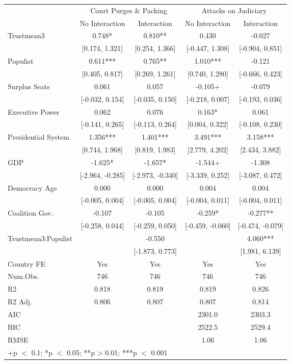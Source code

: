 \begin{table}
\centering\centering\centering
\fontsize{10}{12}\selectfont
\begin{tabular}[t]{lcccc}
\toprule
\multicolumn{1}{c}{ } & \multicolumn{2}{c}{Court Purges \& Packing} & \multicolumn{2}{c}{Attacks on Judiciary} \\
\cmidrule(l{3pt}r{3pt}){2-3} \cmidrule(l{3pt}r{3pt}){4-5}
  & No Interaction & Interaction & No Interaction  & Interaction \\
\midrule
Trustmean3 & 0.748* & 0.810** & 0.430 & -0.027\\
 & {}[0.174, 1.321] & {}[0.254, 1.366] & {}[-0.447, 1.308] & {}[-0.904, 0.851]\\
Populist & 0.611*** & 0.765** & 1.010*** & -0.121\\
 & {}[0.405, 0.817] & {}[0.269, 1.261] & {}[0.740, 1.280] & {}[-0.666, 0.423]\\
Surplus Seats & 0.061 & 0.057 & -0.105+ & -0.079\\
 & {}[-0.032, 0.154] & {}[-0.035, 0.150] & {}[-0.218, 0.007] & {}[-0.193, 0.036]\\
Executive Power & 0.062 & 0.076 & 0.163* & 0.061\\
 & {}[-0.141, 0.265] & {}[-0.113, 0.264] & {}[0.004, 0.322] & {}[-0.108, 0.230]\\
Presidential System & 1.356*** & 1.401*** & 3.491*** & 3.158***\\
 & {}[0.744, 1.968] & {}[0.819, 1.983] & {}[2.779, 4.202] & {}[2.434, 3.882]\\
GDP & -1.625* & -1.657* & -1.544+ & -1.308\\
 & {}[-2.964, -0.285] & {}[-2.973, -0.340] & {}[-3.339, 0.252] & {}[-3.087, 0.472]\\
Democracy Age & 0.000 & 0.000 & 0.004 & 0.004\\
 & {}[-0.005, 0.004] & {}[-0.005, 0.004] & {}[-0.004, 0.011] & {}[-0.004, 0.011]\\
Coalition Gov. & -0.107 & -0.105 & -0.259* & -0.277**\\
 & {}[-0.258, 0.044] & {}[-0.259, 0.050] & {}[-0.459, -0.060] & {}[-0.474, -0.079]\\
Trustmean3:Populist &  & -0.550 &  & 4.060***\\
 &  & {}[-1.873, 0.773] &  & {}[1.981, 6.139]\\
\midrule
Country FE & Yes & Yes & Yes & Yes\\
Num.Obs. & 746 & 746 & 746 & 746\\
R2 & 0.818 & 0.819 & 0.819 & 0.826\\
R2 Adj. & 0.806 & 0.807 & 0.807 & 0.814\\
AIC &  &  & 2301.0 & 2303.3\\
BIC &  &  & 2522.5 & 2529.4\\
RMSE &  &  & 1.06 & 1.06\\
\bottomrule
\multicolumn{5}{l}{\rule{0pt}{1em}+p $<$ 0.1; *p $<$ 0.05; **p > 0.01; ***p $<$ 0.001}\\
\end{tabular}
\end{table}
